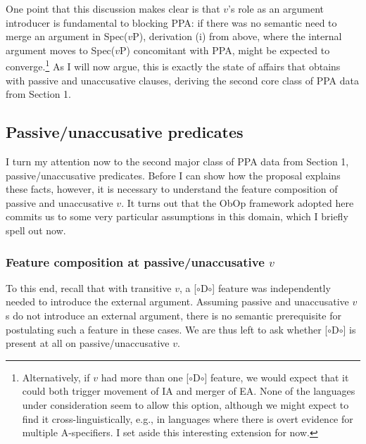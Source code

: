 \documentclass[11pt, letterpaper]{paper_nick}
\newcommand{\fm}[1]{[$\circ$#1$\circ$]}
\begin{document}
One point that this discussion makes clear is that $v$'s role as an argument introducer is fundamental to blocking PPA: if there was no semantic need to merge an argument in Spec($v$P), derivation (i) from above, where the internal argument moves to Spec($v$P) concomitant with PPA, might be expected to converge.\footnote{Alternatively, if $v$ had more than one \fm{D} feature, we would expect that it could both trigger movement of IA and merger of EA. None of the languages under consideration seem to allow this option, although we might expect to find it cross-linguistically, e.g., in languages where there is overt evidence for multiple A-specifiers. I set aside this interesting extension for now.} As I will now argue, this is exactly the state of affairs that obtains with passive and unaccusative clauses, deriving the second core class of PPA data from Section 1.  


\subsection{Passive/unaccusative predicates}
I turn my attention now to the second major class of PPA data from Section 1, passive/unaccusative predicates. Before I can show how the proposal explains these facts, however, it is necessary to understand the feature composition of passive and unaccusative $v$. It turns out that the ObOp framework adopted here commits us to some very particular assumptions in this domain, which I briefly spell out now.

\subsubsection{Feature composition at passive/unaccusative $v$}
To this end, recall that with transitive $v$, a \fm{D} feature was independently needed to introduce the external argument. Assuming passive and unaccusative $v$s do not introduce an external argument, there is no semantic prerequisite for postulating such a feature in these cases. We are thus left to ask whether \fm{D} is present at all on passive/unaccusative $v$.%
\end{document}
